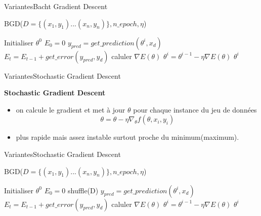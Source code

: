 \documentclass{beamer}
\begin{document}
\begin{frame}{Variantes}{Bacht Gradient Descent}

\begin{center}
	\begin{algorithm}[H]
		\caption{BGD($ D = \lbrace (x_{1},y_{1})...(x_{n},y_{n}) \rbrace, n\_epoch, \eta$)}
		\begin{algorithmic} 
			\STATE Initialiser $\theta^{0}$
			\STATE $E_{0} = 0$
			\STATE $y_{pred} = get\_prediction(\theta^{i}, x_{d})$
			\STATE $E_{t} = E_{t-1} + get\_error(y_{pred}, y_{d})$
			\ENDFOR
			\STATE caluler $\nabla E(\theta )$
			\STATE $\theta^{i} = \theta^{i-1} - \eta\nabla E(\theta ) $
			\ENDFOR
			\RETURN $\theta^{i}$
		\end{algorithmic}
	\end{algorithm}
\end{center}

\end{frame}

\begin{frame}{Variantes}{Stochastic Gradient Descent}

	\textbf{Stochastic Gradient Descent}
	\begin{itemize}
		\item on calcule le gradient et met à jour $\theta$  pour chaque instance du jeu de données
		\begin{equation}
		\theta = \theta - \eta \nabla_{\theta}f(\theta, x_{i}, y_{i})
		\end{equation}
		\item plus rapide mais assez instable surtout proche du minimum(maximum).
	\end{itemize}

\end{frame}

\begin{frame}{Variantes}{Stochastic Gradient Descent}

\begin{center}
\begin{algorithm}[H]
	\caption{BGD($ D = \lbrace (x_{1},y_{1})...(x_{n},y_{n}) \rbrace, n\_epoch, \eta$)}
	\begin{algorithmic} 
		\STATE Initialiser $\theta^{0}$
		\STATE $E_{0} = 0$
		\FOR{$i=1$ \TO $n\_epoch$ } 
		\STATE shuffle(D)
		\FORALL{$(x_{d},y_{d})$ in D } 
		\STATE $y_{pred} = get\_prediction(\theta^{i}, x_{d})$
		\STATE $E_{t} = E_{t-1} + get\_error(y_{pred}, y_{d})$
		\STATE caluler $\nabla E(\theta )$
		\STATE $\theta^{i} = \theta^{i-1} - \eta\nabla E(\theta ) $
		\ENDFOR
		\ENDFOR
		\RETURN $\theta^{i}$
	\end{algorithmic}
\end{algorithm}
\end{center}

\end{frame}
\end{document}
